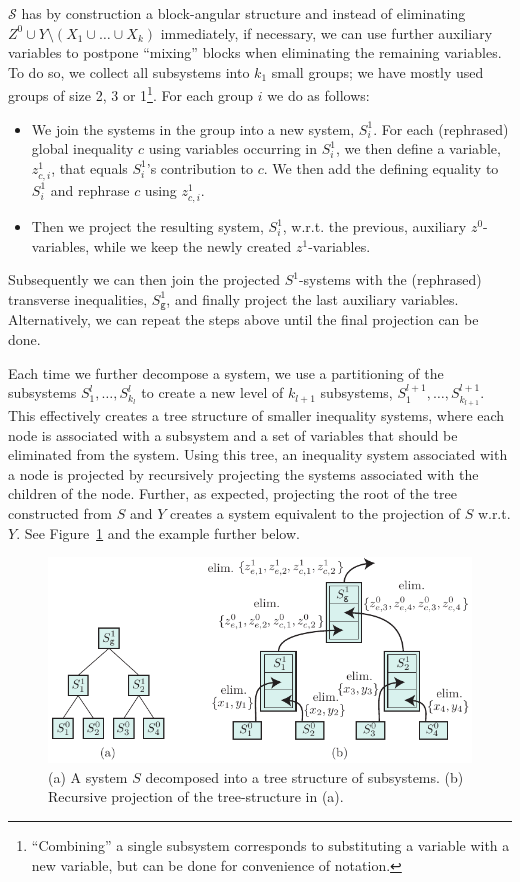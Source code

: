 \documentclass[citeauthoryear]{llncs}
\newcommand{\trt}[1]{\texttt{#1}}
\begin{document}
$\mathcal{S}$ has by construction a block-angular structure and instead of eliminating $Z^0\cup Y\setminus(X_1\cup\ldots\cup X_k)$ immediately, if necessary, we can use further auxiliary variables to postpone ``mixing'' blocks when eliminating the remaining variables. 
To do so, we collect all subsystems into $k_1$ small groups; we have mostly used groups of size 2, 3 or 1\footnote{``Combining'' a single subsystem corresponds to substituting a variable with a new variable, but can be done for convenience of notation.}. For each group $i$ we do as follows:
\begin{itemize}\itemsep0em
\item We join the systems in the group into a new system, $S^1_i$. For each (rephrased) global inequality $c$ using variables occurring in $S^1_i$, we then define a variable, $z^1_{c,i}$, that equals $S^1_i$'s contribution to $c$. We then add the defining equality to $S^1_i$ and rephrase $c$ using $z^1_{c,i}$.
\item Then we project the resulting system, $S^1_i$, w.r.t. the previous, auxiliary $z^0$-variables, while we keep the newly created $z^1$-variables.
\end{itemize} 
Subsequently we can then join the projected $S^1$-systems with the (rephrased) transverse inequalities, $S_\trt{g}^1$, and finally project the last auxiliary variables. Alternatively, we can repeat the steps above until the final projection can be done. 

Each time we further decompose a system, we use a partitioning of the subsystems $S^l_1, \ldots, S^l_{k_l}$ to create a new level of $k_{l+1}$ subsystems, $S^{l+1}_1,\ldots, S^{l+1}_{k_{l+1}}$. This effectively creates a tree structure of smaller inequality systems, where each node is associated with a subsystem and a set of variables that should be eliminated from the system. Using this tree, an inequality system associated with a node is projected by recursively projecting the systems associated with the children of the node. Further, as expected, projecting the root of the tree constructed from $S$ and $Y$ creates a system equivalent to the projection of $S$ w.r.t. $Y$. See Figure~\ref{fig:decomp2} and the example further below.

\begin{figure}[htbp]
	\centering
		\includegraphics{figures/Example3.pdf}
	\caption{(a) A system $S$ decomposed into a tree structure of subsystems. (b) Recursive projection of the tree-structure in (a).}
	\label{fig:decomp2}
\end{figure}
\end{document}
